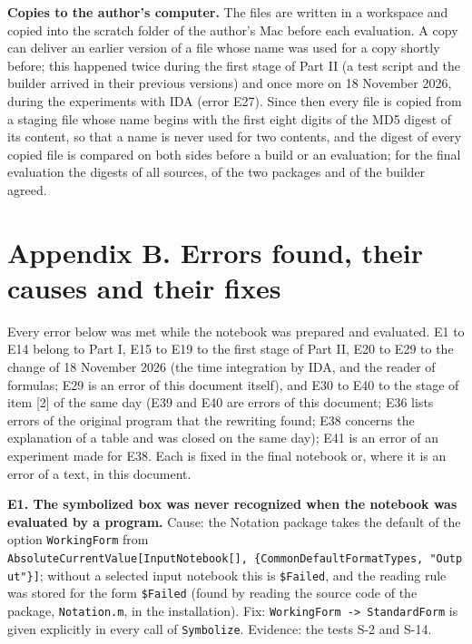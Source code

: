 \documentclass[
  10pt,
]{article}
\begin{document}
\textbf{Copies to the author's computer.} The files are written in a
workspace and copied into the scratch folder of the author's Mac before
each evaluation. A copy can deliver an earlier version of a file whose
name was used for a copy shortly before; this happened twice during the
first stage of Part II (a test script and the builder arrived in their
previous versions) and once more on 18 November 2026, during the
experiments with IDA (error E27). Since then every file is copied from a
staging file whose name begins with the first eight digits of the MD5
digest of its content, so that a name is never used for two contents,
and the digest of every copied file is compared on both sides before a
build or an evaluation; for the final evaluation the digests of all
sources, of the two packages and of the builder agreed.

\hypertarget{appendix-b.-errors-found-their-causes-and-their-fixes}{%
\section{Appendix B. Errors found, their causes and their
fixes}\label{appendix-b.-errors-found-their-causes-and-their-fixes}}

Every error below was met while the notebook was prepared and evaluated.
E1 to E14 belong to Part I, E15 to E19 to the first stage of Part II,
E20 to E29 to the change of 18 November 2026 (the time integration by
IDA, and the reader of formulas; E29 is an error of this document
itself), and E30 to E40 to the stage of item {[}2{]} of the same day
(E39 and E40 are errors of this document; E36 lists errors of the
original program that the rewriting found; E38 concerns the explanation
of a table and was closed on the same day); E41 is an error of an
experiment made for E38. Each is fixed in the final notebook or, where
it is an error of a text, in this document.

\textbf{E1. The symbolized box was never recognized when the notebook
was evaluated by a program.} Cause: the Notation package takes the
default of the option \texttt{WorkingForm} from
\texttt{AbsoluteCurrentValue{[}InputNotebook{[}{]},\ \{CommonDefaultFormatTypes,\ "Output"\}{]}};
without a selected input notebook this is \texttt{\$Failed}, and the
reading rule was stored for the form \texttt{\$Failed} (found by reading
the source code of the package, \texttt{Notation.m}, in the
installation). Fix: \texttt{WorkingForm\ -\textgreater{}\ StandardForm}
is given explicitly in every call of \texttt{Symbolize}. Evidence: the
tests S-2 and S-14.
\end{document}
